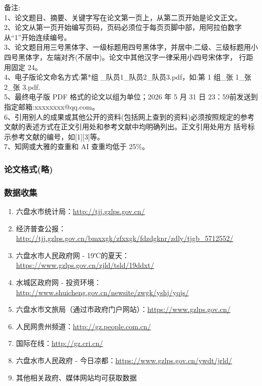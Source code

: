 备注: \\
1、论文题目、摘要、关键字写在论文第一页上，从第二页开始是论文正文。\\
2、论文从第一页开始编写页码，页码必须位于每页页脚中部，用阿拉伯数字从“1”开始连续编号。\\
3、论文题目用三号黑体字、一级标题用四号黑体字，并居中;二级、三级标题用小四号黑体字，左端对齐(不居中)。论文中其他汉字一律采用小四号宋体字， 行距用固定 24。\\
4、电子版论文命名方式:第*组 \_队员1\_队员2\_队员3.pdf，如:第 1 组\_张 1\_张 2\_张 3.pdf. \\
5、最终电子版 PDF 格式的论文以组为单位；2026 年 5 月 31 日 23：59前发送到指定邮箱:xxxxxxxx@qq.com。 \\
6、引用别人的成果或其他公开的资料(包括网上查到的资料)必须按照规定的参考文献的表述方式在正文引用处和参考文献中均明确列出。正文引用处用方 括号标示参考文献的编号，如[1][3]等。\\
7、知网或大雅的查重和 AI 查重均低于 25\%。

\subsubsection*{论文格式(略)}

\subsubsection*{数据收集}

\begin{enumerate}
  \renewcommand{\labelenumi}{(\arabic*)}   %
  \item 六盘水市统计局：\url{http://tjj.gzlps.gov.cn/}
  \item 经济普查公报：\url{http://tjj.gzlps.gov.cn/bmxxgk/zfxxgk/fdzdgknr/zdly/tjgb_5712552/}
  \item 六盘水市人民政府网 - 19℃的夏天：\url{https://www.gzlps.gov.cn/zjld/tsld/19ddxt/}
  \item 水城区政府网 - 投资环境：\url{http://www.shuicheng.gov.cn/newsite/zwgk/yshj/yqjs/}
  \item 六盘水市文旅局（通过市政府门户网站）：\url{https://www.gzlps.gov.cn/}
  \item 人民网贵州频道：\url{http://gz.people.com.cn/}
  \item 国际在线：\url{http://gz.cri.cn/}
  \item 六盘水市人民政府 - 今日凉都：\url{https://www.gzlps.gov.cn/ywdt/jrld/}
  \item 其他相关政府、媒体网站均可获取数据
\end{enumerate}

